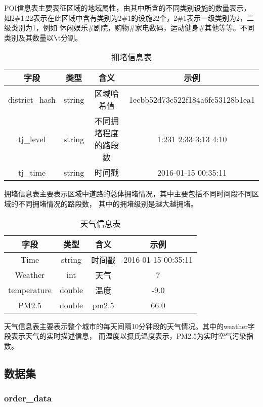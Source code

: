 \documentclass[hyperref,UTF8]{ctexart}
\theoremstyle{definition}
\theoremstyle{remark}
\numberwithin{equation}{subsection}
\begin{document}
	POI信息表主要表征区域的地域属性，由其中所含的不同类别设施的数量表示，
如2\#1:22表示在此区域中含有类别为2\#1的设施22个，2\#1表示一级类别为2，二级类别为1，例如
休闲娱乐\#剧院，购物\#家电数码，运动健身\#其他等等。不同类别及其数量以$\verb|\|$t分割。
	
	\begin{table}[H]
    \centering
	\caption{拥堵信息表}
	\begin{tabular}{|c|c|c|c|}
	\hline
	字段	&	类型	&	含义	&	示例		\\
	\hline
	district\_hash & string & 区域哈希值 & 1ecbb52d73c522f184a6fc53128b1ea1		\\
	tj\_level & string & 不同拥堵程度的路段数 & 1:231 2:33 3:13 4:10			\\
	tj\_time & string & 时间戳 & 2016-01-15 00:35:11							\\
	\hline
	\end{tabular}
	\end{table}
	
	拥堵信息表主要表示区域中道路的总体拥堵情况，其中主要包括不同时间段不同区域的不同拥堵情况的路段数，
其中的拥堵级别是越大越拥堵。

	\begin{table}[H]
    \centering
	\caption{天气信息表}
	\begin{tabular}{|c|c|c|c|}
	\hline
	字段	&	类型	&	含义	&	示例		\\
	\hline
	Time & string & 时间戳 & 2016-01-15 00:35:11	\\
	Weather & int & 天气 & 7	\\
	temperature & double & 温度 & -9.0	\\
	PM2.5 & double & pm2.5 & 66.0	\\
	\hline
	\end{tabular}
	\end{table}
	
	天气信息表主要表示整个城市的每天间隔10分钟段的天气情况。其中的weather字段表示天气的实时描述信息，
而温度以摄氏温度表示，PM2.5为实时空气污染指数。

	
\subsection{数据集}	
\label{sec:data_set}

\subsubsection{order\_data}
\end{document}
